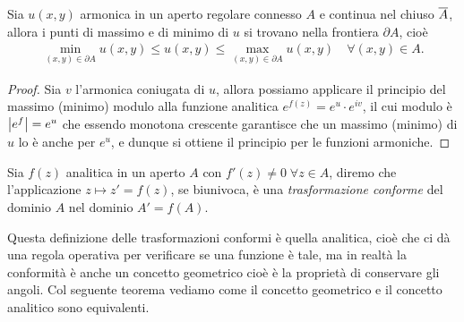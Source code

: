 \begin{theorem}
  Sia $ u(x,y) $ armonica in un aperto regolare connesso $ A $ e continua nel chiuso $ \overline{A} $, allora i punti di massimo e di minimo 
  di $ u $ si trovano nella frontiera $ \partial A $, cioè 
  \begin{align}
    \min_{(x,y) \in \partial A} u(x,y) \leq u(x,y) \leq \max_{(x,y) \in \partial A} u(x,y) \quad \forall (x,y) \in A.
  \end{align}
\end{theorem}
\begin{proof}
  Sia $ v $ l'armonica coniugata di $ u $, allora possiamo applicare il principio del massimo (minimo) modulo alla funzione analitica 
  $ e^{f(z)} = e^u \cdot e^{iv} $, il cui modulo è $ \left|{e^f}\right| = e^u $ che essendo monotona crescente garantisce che un massimo (minimo) di 
  $ u $ lo è anche per $ e^u $, e dunque si ottiene il principio per le funzioni armoniche. 
\end{proof}

\begin{definition}
  Sia $ f(z) $ analitica in un aperto $ A $ con $ f'(z) \neq 0 \; \forall z \in A $, diremo che l'applicazione $ z \mapsto z' = f(z) $, se biunivoca, è 
  una \textit{trasformazione conforme} del dominio $ A $ nel dominio $ A' = f(A) $.
\end{definition}

Questa definizione delle trasformazioni conformi è quella analitica, cioè che ci dà una regola operativa per verificare se una funzione è tale, ma in 
realtà la conformità è anche un concetto geometrico cioè è la proprietà di conservare gli angoli. Col seguente teorema vediamo come il concetto 
geometrico e il concetto analitico sono equivalenti.

